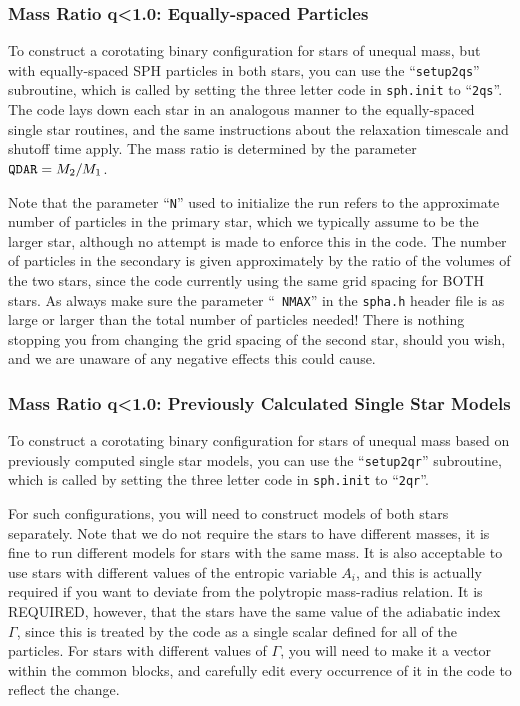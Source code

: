 \subsubsection{Mass Ratio q\textless 1.0: Equally-spaced Particles}
\label{in:2q:es}
To construct a corotating binary configuration for stars of unequal
mass, but with equally-spaced SPH particles
in both stars, you can use the
``{\tt setup2qs}'' subroutine, which is called by setting the three
letter code in {\tt sph.init} to ``{\tt 2qs}''.  
The code lays down each star in an analogous manner to the equally-spaced
single star routines, and the same instructions about the relaxation
timescale and shutoff time apply.  The mass ratio is determined by the
parameter ${\tt QDAR}=M_2/M_1$.

Note that the parameter ``{\tt N}'' used to initialize the run refers
to the approximate number of particles in the primary star, which we
typically assume to be the larger star, although no attempt is made to
enforce this in the code. The number of particles in the secondary is
given approximately by the ratio of the volumes of the two stars, since
the code currently using the same grid spacing for BOTH stars.
As always make sure the parameter ``{\tt
NMAX}'' in the {\tt spha.h} header file is as large or larger than the
total number of particles needed!
There is nothing stopping you from changing the grid spacing of the
second star, should you wish, and we are unaware of any negative
effects this could cause.

\subsubsection{Mass Ratio q\textless 1.0: Previously Calculated Single Star Models}
\label{in:2q:er}
To construct a corotating binary configuration for stars of unequal
mass based on 
previously computed single star models, you can use the
``{\tt setup2qr}'' subroutine, which is called by setting the three
letter code in {\tt sph.init} to ``{\tt 2qr}''.

For such configurations, you will need to construct models of 
both stars separately.  Note that we do not require the stars to have
different masses, it is fine to run different models for stars with
the same mass.  It is also acceptable to use stars with different
values of the entropic variable $A_i$, and this is actually required if you
want to deviate from the polytropic mass-radius relation.  It is
REQUIRED, however, that the stars have the same value of the
adiabatic index $\Gamma$, since this is treated by the code as a
single scalar defined for all of the particles.  For stars with
different values of $\Gamma$, you will need to make it a vector within
the common blocks, and carefully edit every occurrence of it in the
code to reflect the change.

